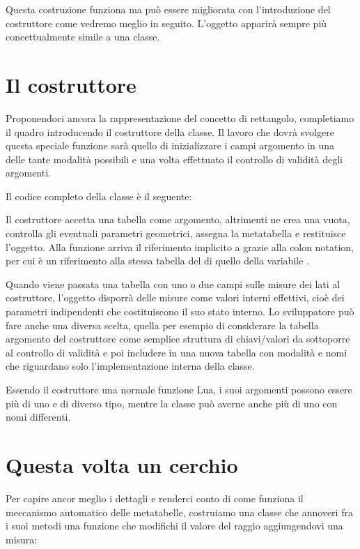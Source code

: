 Questa costruzione funziona ma può essere migliorata con l'introduzione del
costruttore come vedremo meglio in seguito. L'oggetto  apparirà
sempre più concettualmente simile a una classe.


\section{Il costruttore}
\label{secFondCostruttore}

Proponendoci ancora la rappresentazione del concetto di rettangolo, completiamo
il quadro introducendo il costruttore della classe. Il lavoro che dovrà
svolgere questa speciale funzione sarà quello di inizializzare i campi
argomento in una delle tante modalità possibili e una volta effettuato il
controllo di validità degli argomenti.

Il codice completo della classe  è il seguente:

Il costruttore  accetta una tabella come argomento, altrimenti ne crea
una vuota, controlla gli eventuali parametri geometrici, assegna la metatabella
e restituisce l'oggetto. Alla funzione arriva il riferimento implicito a
 grazie alla colon notation, per cui  è un riferimento
alla stessa tabella del di quello della variabile .

Quando viene passata una tabella con uno o due campi sulle misure dei lati al
costruttore, l'oggetto disporrà delle misure come valori interni effettivi,
cioè dei parametri indipendenti che costituiscono il suo stato interno. Lo
sviluppatore può fare anche una diversa scelta, quella per esempio di
considerare la tabella argomento del costruttore come semplice struttura di
chiavi/valori da sottoporre al controllo di validità e poi includere in una
nuova tabella con modalità e nomi che riguardano solo l'implementazione interna
della classe.

Essendo il costruttore una normale funzione Lua, i suoi argomenti possono essere
più di uno e di diverso tipo, mentre la classe può averne anche più di uno con
nomi differenti.


\section{Questa volta un cerchio}

Per capire ancor meglio i dettagli e renderci conto di come funziona il
meccanismo automatico delle metatabelle, costruiamo una classe  che
annoveri fra i suoi metodi una funzione che modifichi il valore del raggio
aggiungendovi una misura:

